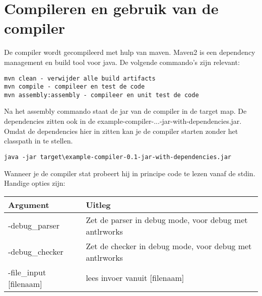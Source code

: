 \section{Compileren en gebruik van de compiler}
De compiler wordt gecompileerd met hulp van maven. Maven2 is een dependency management en build tool voor java. De volgende commando's zijn relevant:

\begin{verbatim}
mvn clean - verwijder alle build artifacts
mvn compile - compileer en test de code
mvn assembly:assembly - compileer en unit test de code
\end{verbatim}

Na het assembly commando staat de jar van de compiler in de target map. De dependencies zitten ook in de example-compiler-...-jar-with-dependencies.jar. Omdat de dependencies hier in zitten kan je de compiler starten zonder het classpath in te stellen.

\begin{verbatim}
java -jar target\example-compiler-0.1-jar-with-dependencies.jar
\end{verbatim}

Wanneer je de compiler stat probeert hij in principe code te lezen vanaf de stdin. Handige opties zijn:
\begin{tabular*}{0.75\textwidth}{ |l | l|}
	\hline
	Argument		&	Uitleg \\
	\hline
	-debug_parser	& Zet de parser in debug mode, voor debug met antlrworks \\
	-debug_checker	& Zet de checker in debug mode, voor debug met antlrworks \\
	-file_input [filenaam] & lees invoer vanuit [filenaam] \\
\end{tabular*}